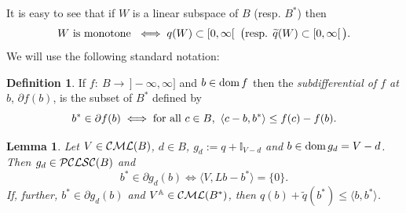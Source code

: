 \documentclass[letterpaper]{article}
\theoremstyle{plain}
\newtheorem{lemma}[theorem]{Lemma}
\theoremstyle{definition}
\newtheorem{definition}[theorem]{Definition}
\numberwithin{equation}{section}
\newcommand{\A}{{\mathbb A}}
\newcommand{\all}{\hbox{for all}}
\newcommand{\bra}[2]{\langle#1,#2\rangle}
\newcommand{\CML}{{\cal CML}}
\newcommand{\dom}{\hbox{\rm dom}}
\newcommand{\I}{\mathbb I}
\newcommand{\PCLSC}{{\cal PCLSC}}
\newcommand{\qt}{\wt q}
\newcommand{\rbar}{\,]{-}\infty,\infty]}
\newcommand{\wt}{\widetilde}
\newcommand{\Def}{Definition~\ref}
\newcommand{\Lem}{Lemma~\ref}
\begin{document}
\par
It is easy to see that if $W$ is a linear subspace of $B$ (resp. $B^*$) then
\begin{equation}\label{Wmon}
W\hbox{ is monotone }\iff q(W) \subset [0,\infty[\enspace\big(\hbox{resp. } \qt(W) \subset [0,\infty[\,\big). 
\end{equation}
%
We will use the following standard notation:
\begin{definition}\label{SUBdef}
If $f\colon\ B \to \rbar$ and $b \in \dom\,f$ then the {\em subdifferential of $f$ at $b$}, $\partial f(b)$, is the subset of $B^*$ defined by
%
$$b^* \in \partial f(b) \iff \all\ c \in B,\ \bra{c - b}{b^*} \le f(c) - f(b).$$
\end{definition}   
\begin{lemma}\label{subglem}
Let $V \in \CML(B)$, $d \in B$, $g_d:= q + \I_{V - d}$ and $b \in \dom\,g_d = V - d$.   Then $g_d \in \PCLSC(B)$ and
\begin{equation}\label{subg1}
b^* \in \partial g_d(b) \iff \bra{V}{Lb - b^*} = \{0\}.
\end{equation}
If, further, $b^* \in \partial g_d(b)$  and  $V^\A \in \CML(B^*)$, then $q(b) + \qt(b^*) \le \bra{b}{b^*}$.
\end{lemma}
%
\end{document}
